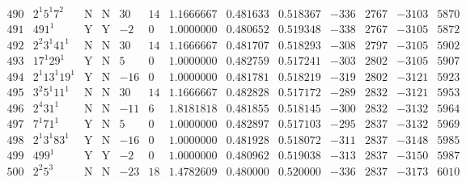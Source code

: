 \documentclass[11pt,reqno,a4letter]{article}
\numberwithin{equation}{section}
\numberwithin{figure}{section}
\numberwithin{table}{section}
\theoremstyle{plain}
\numberwithin{theorem}{section}
\theoremstyle{definition}
\begin{document}
\begin{table}[ht]
\begin{equation*}
{\begin{array}{cc|cc|ccc|cc|cccc}
 490 & 2^1 5^1 7^2 & \text{N} & \text{N} & 30 & 14 & 1.1666667 & 0.481633 & 0.518367 & -336 & 2767 & -3103 & 5870 \\
 491 & 491^1 & \text{Y} & \text{Y} & -2 & 0 & 1.0000000 & 0.480652 & 0.519348 & -338 & 2767 & -3105 & 5872 \\
 492 & 2^2 3^1 41^1 & \text{N} & \text{N} & 30 & 14 & 1.1666667 & 0.481707 & 0.518293 & -308 & 2797 & -3105 & 5902 \\
 493 & 17^1 29^1 & \text{Y} & \text{N} & 5 & 0 & 1.0000000 & 0.482759 & 0.517241 & -303 & 2802 & -3105 & 5907 \\
 494 & 2^1 13^1 19^1 & \text{Y} & \text{N} & -16 & 0 & 1.0000000 & 0.481781 & 0.518219 & -319 & 2802 & -3121 & 5923 \\
 495 & 3^2 5^1 11^1 & \text{N} & \text{N} & 30 & 14 & 1.1666667 & 0.482828 & 0.517172 & -289 & 2832 & -3121 & 5953 \\
 496 & 2^4 31^1 & \text{N} & \text{N} & -11 & 6 & 1.8181818 & 0.481855 & 0.518145 & -300 & 2832 & -3132 & 5964 \\
 497 & 7^1 71^1 & \text{Y} & \text{N} & 5 & 0 & 1.0000000 & 0.482897 & 0.517103 & -295 & 2837 & -3132 & 5969 \\
 498 & 2^1 3^1 83^1 & \text{Y} & \text{N} & -16 & 0 & 1.0000000 & 0.481928 & 0.518072 & -311 & 2837 & -3148 & 5985 \\
 499 & 499^1 & \text{Y} & \text{Y} & -2 & 0 & 1.0000000 & 0.480962 & 0.519038 & -313 & 2837 & -3150 & 5987 \\
 500 & 2^2 5^3 & \text{N} & \text{N} & -23 & 18 & 1.4782609 & 0.480000 & 0.520000 & -336 & 2837 & -3173 & 6010 \\
\end{array}
}
\end{equation*}

\end{table} 

\clearpage 
\end{document}
